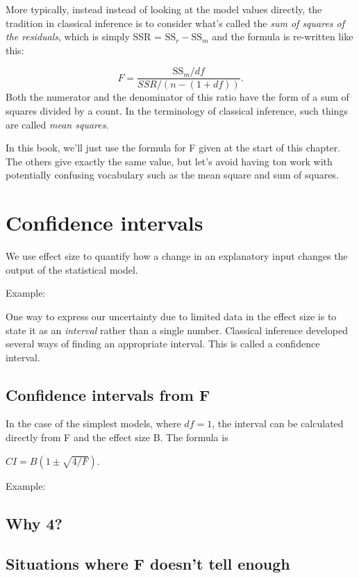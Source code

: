 \documentclass[]{book}
\begin{document}
More typically, instead instead of looking at the model values directly, the tradition in classical inference is to consider what's called the \emph{sum of squares of the residuals}, which is simply SSR = \(\mbox{SS}_r - \mbox{SS}_m\) and the formula is re-written like this:

\[F = \frac{\mbox{SS}_m / df}{SSR / (n -  (1+df))}.\]
Both the numerator and the denominator of this ratio have the form of a sum of squares divided by a count. In the terminology of classical inference, such things are called \emph{mean squares}.

In this book, we'll just use the formula for F given at the start of this chapter. The others give exactly the same value, but let's avoid having ton work with potentially confusing vocabulary such as the mean square and sum of squares.

\hypertarget{confidence-intervals}{%
\chapter{Confidence intervals}\label{confidence-intervals}}

We use effect size to quantify how a change in an explanatory input changes the output of the statistical model.

Example:

One way to express our uncertainty due to limited data in the effect size is to state it as an \emph{interval} rather than a single number. Classical inference developed several ways of finding an appropriate interval. This is called a confidence interval.

\hypertarget{confidence-intervals-from-f}{%
\section{Confidence intervals from F}\label{confidence-intervals-from-f}}

In the case of the simplest models, where \(df = 1\), the interval can be calculated directly from F and the effect size B. The formula is

\(CI = B (1 \pm \sqrt{4/F}).\)

Example:

\hypertarget{why-4}{%
\section{Why 4?}\label{why-4}}

\hypertarget{situations-where-f-doesnt-tell-enough}{%
\section{Situations where F doesn't tell enough}\label{situations-where-f-doesnt-tell-enough}}
\end{document}
